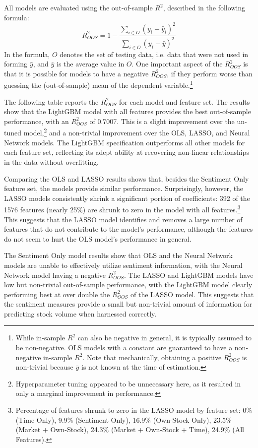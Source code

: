 \documentclass[12pt]{article}
\begin{document}
All models are evaluated using the out-of-sample $R^2$, described in the following formula:
\begin{equation}
    R^2_{OOS} = 1 - \frac{\sum_{i\in O} (y_i - \hat{y}_i)^2}{\sum_{i\in O} (y_i - \bar{y})^2}
\end{equation}
In the formula, $O$ denotes the set of testing data, i.e. data that were not used in forming $\hat{y}$, and $\bar{y}$ is the average value in $O$. One important aspect of the $R^2_{OOS}$ is that it is possible for models to have a negative $R^2_{OOS}$, if they perform worse than guessing the (out-of-sample) mean of the dependent variable.\footnote{While in-sample $R^2$ can also be negative in general, it is typically assumed to be non-negative. OLS models with a constant are guaranteed to have a non-negative in-sample $R^2$. Note that mechanically, obtaining a positive $R^2_{OOS}$ is non-trivial because $\bar{y}$ is not known at the time of estimation.}

The following table reports the $R^2_{OOS}$ for each model and feature set. The results show that the LightGBM model with all features provides the best out-of-sample performance, with an $R^2_{OOS}$ of 0.7007. This is a slight improvement over the un-tuned model,\footnote{Hyperparameter tuning appeared to be unnecessary here, as it resulted in only a marginal improvement in performance.} and a non-trivial improvement over the OLS, LASSO, and Neural Network models. The LightGBM specification outperforms all other models for each feature set, reflecting its adept ability at recovering non-linear relationships in the data without overfitting.



Comparing the OLS and LASSO results shows that, besides the Sentiment Only feature set, the models provide similar performance. Surprisingly, however, the LASSO models consistently shrink a significant portion of coefficients: 392 of the 1576 features (nearly 25\%) are shrunk to zero in the model with all features.\footnote{Percentage of features shrunk to zero in the LASSO model by feature set: 0\% (Time Only), 9.9\% (Sentiment Only), 16.9\% (Own-Stock Only), 23.5\% (Market + Own-Stock), 24.3\% (Market + Own-Stock + Time), 24.9\% (All Features).} This suggests that the LASSO model identifies and removes a large number of features that do not contribute to the model's performance, although the features do not seem to hurt the OLS model's performance in general.

The Sentiment Only model results show that OLS and the Neural Network models are unable to effectively utilize sentiment information, with the Neural Network model having a negative $R^2_{OOS}$. The LASSO and LightGBM models have low but non-trivial out-of-sample performance, with the LightGBM model clearly performing best at over double the $R^2_{OOS}$ of the LASSO model. This suggests that the sentiment measures provide a small but non-trivial amount of information for predicting stock volume when harnessed correctly.
\end{document}
